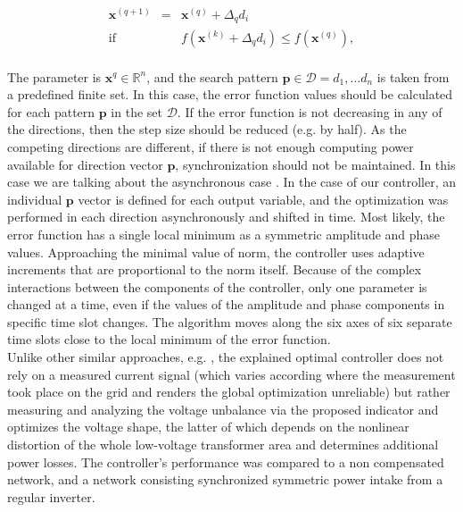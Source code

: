         \begin{equation}
        \label{eqn:contstruct2}
        \begin{array}{rcl}
         \textbf{x}^{(q+1)}&=&\textbf{x}^{(q)}+\Delta_qd_i \\
         \mathrm{if}&&f(\textbf{x}^{(k)}+\Delta_qd_i) \leq f(\textbf{x}^{(q)}),\\
         \end{array}
        \end{equation}

        The parameter is $\textbf{x}^q\in\mathbb{R}^n$, and the search pattern $\textbf{p}\in\mathcal{D}={d_1,...d_n}$ is taken from a predefined finite set. In this case, the error function values should be calculated for each pattern $\textbf{p}$ in the set $\mathcal{D}$. If the error function is not decreasing in any of the directions, then the step size should be reduced (e.g. by half). As the competing directions are different, if there is not enough computing power available for direction vector $\textbf{p}$, synchronization should not be maintained. In this case we are talking about the asynchronous case . In the case of our controller, an individual $\textbf{p}$ vector is defined for each output variable, and the optimization was performed in each direction asynchronously and shifted in time. Most likely, the error function has a single local minimum as a symmetric amplitude and phase values. Approaching the minimal value of norm, the controller uses adaptive increments that are proportional to the norm itself. Because of the complex interactions between the components of the controller, only one parameter is changed at a time, even if the values of the amplitude and phase components in specific time slot changes. The algorithm moves along the six axes of six separate time slots close to the local minimum of the error function.\\
        Unlike other similar approaches, e.g. \cite{segui2007approach}, the explained optimal controller does not rely on a measured current signal (which varies according where the measurement took place on the grid and renders the global optimization unreliable) but rather measuring and analyzing the voltage unbalance via the proposed indicator and optimizes the voltage shape, the latter of which depends on the nonlinear distortion of the whole low-voltage transformer area and determines additional power losses. The controller's performance was compared to a non compensated network, and a network consisting synchronized symmetric power intake from a regular inverter.\\
